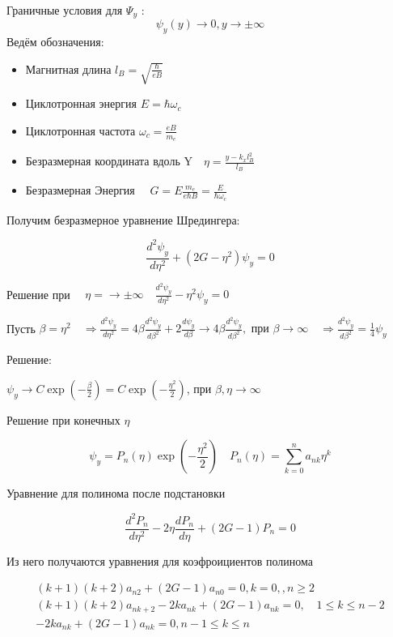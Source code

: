 Граничные условия для $\Psi_{y}$ :
$$
\psi_{y}(y) \rightarrow 0, y \rightarrow \pm \infty
$$
Ведём обозначения:
\begin{itemize}
\item Магнитная длина $l_{B}=\sqrt{\frac{\hbar}{e B}}$
\item Циклотронная энергия $E=\hbar \omega_{c}$
\item Циклотронная частота $\omega_{c}=\frac{e B}{m_{e}}$
\item Безразмерная координата вдоль $\mathrm{Y} \quad \eta=\frac{y-k_{x} l_{B}^{2}}{l_{B}}$
\item Безразмерная Энергия $\quad G=E \frac{m_{e}}{e \hbar B}=\frac{E}{\hbar \omega_{c}}$
\end{itemize}


Получим безразмерное уравнение Шредингера:

$$
\frac{d^{2} \psi_{y}}{d \eta^{2}}+\left(2 G-\eta^{2}\right) \psi_{y}=0
$$

Решение при $\quad \eta=\rightarrow \pm \infty \quad
\frac{d^{2} \psi_{y}}{d \eta^{2}}-\eta^{2} \psi_{y}=0
$

Пусть $\beta=\eta^{2} \quad \Rightarrow
\frac{d^{2} \psi_{y}}{d \eta^{2}}=4 \beta \frac{d^{2} \psi_{y}}{d \beta^{2}}+2 \frac{d \psi_{y}}{d \beta} \rightarrow 4 \beta \frac{d^{2} \psi_{y}}{d \beta^{2}}, \text { при } \beta \rightarrow \infty \quad \Rightarrow
 \frac{d^{2} \psi_{y}}{d \beta^{2}}=\frac{1}{4} \psi_{y}
$

Решение:

$\psi_{y} \rightarrow C \exp \left(-\frac{\beta}{2}\right)=C \exp \left(-\frac{\eta^{2}}{2}\right)$, при $\beta, \eta \rightarrow \infty$

Решение при конечных $\eta$

$$
\psi_{y}=P_{n}(\eta) \exp \left(-\frac{\eta^{2}}{2}\right) \quad P_{n}(\eta)=\sum_{k=0}^{n} a_{n k} \eta^{k}
$$

Уравнение для полинома после подстановки

$$
\frac{d^{2} P_{n}}{d \eta^{2}}-2 \eta \frac{d P_{n}}{d \eta}+(2 G-1) P_{n}=0
$$

Из него получаются уравнения для коэфроициентов полинома

$$
\begin{gathered}
(k+1)(k+2) a_{n 2}+(2 G-1) a_{n 0}=0, k=0,, n \geq 2 \\
(k+1)(k+2) a_{n k+2}-2 k a_{n k}+(2 G-1) a_{n k}=0, \quad 1 \leq k \leq n-2 \\
-2 k a_{n k}+(2 G-1) a_{n k}=0, n-1 \leq k \leq n
\end{gathered}
$$

